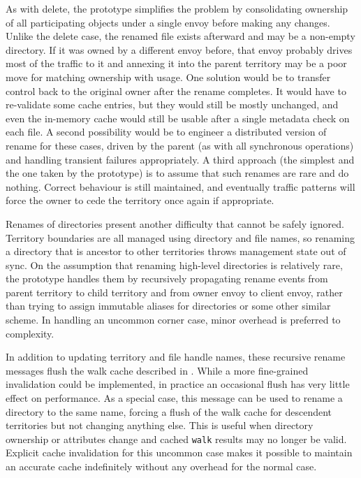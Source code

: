 As with delete, the prototype simplifies the problem by consolidating ownership of all participating objects under a single envoy before making any changes. Unlike the delete case, the renamed file exists afterward and may be a non-empty directory. If it was owned by a different envoy before, that envoy probably drives most of the traffic to it and annexing it into the parent territory may be a poor move for matching ownership with usage. One solution would be to transfer control back to the original owner after the rename completes. It would have to re-validate some cache entries, but they would still be mostly unchanged, and even the in-memory cache would still be usable after a single metadata check on each file. A second possibility would be to engineer a distributed version of rename for these cases, driven by the parent (as with all synchronous operations) and handling transient failures appropriately. A third approach (the simplest and the one taken by the prototype) is to assume that such renames are rare and do nothing. Correct behaviour is still maintained, and eventually traffic patterns will force the owner to cede the territory once again if appropriate.

Renames of directories present another difficulty that cannot be safely ignored. Territory boundaries are all managed using directory and file names, so renaming a directory that is ancestor to other territories throws management state out of sync. On the assumption that renaming high-level directories is relatively rare, the prototype handles them by recursively propagating rename events from parent territory to child territory and from owner envoy to client envoy, rather than trying to assign immutable aliases for directories or some other similar scheme. In handling an uncommon corner case, minor overhead is preferred to complexity.

In addition to updating territory and file handle names, these recursive rename messages flush the walk cache described in . While a more fine-grained invalidation could be implemented, in practice an occasional flush has very little effect on performance. As a special case, this message can be used to rename a directory to the same name, forcing a flush of the walk cache for descendent territories but not changing anything else. This is useful when directory ownership or attributes change and cached \texttt{walk} results may no longer be valid. Explicit cache invalidation for this uncommon case makes it possible to maintain an accurate cache indefinitely without any overhead for the normal case.

